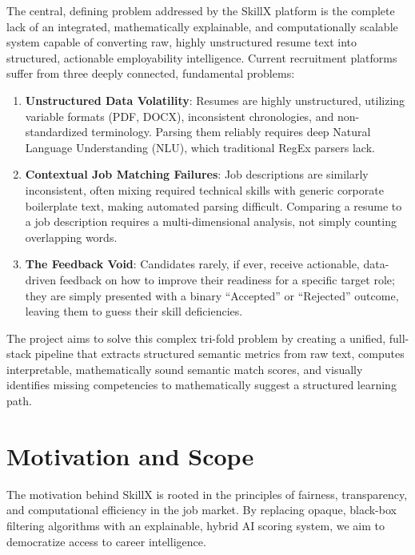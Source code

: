 \documentclass[12pt,a4paper]{report}
\begin{document}
The central, defining problem addressed by the SkillX platform is the complete lack of an integrated, mathematically explainable, and computationally scalable system capable of converting raw, highly unstructured resume text into structured, actionable employability intelligence. Current recruitment platforms suffer from three deeply connected, fundamental problems:

\begin{enumerate}
    \item \textbf{Unstructured Data Volatility}: Resumes are highly unstructured, utilizing variable formats (PDF, DOCX), inconsistent chronologies, and non-standardized terminology. Parsing them reliably requires deep Natural Language Understanding (NLU), which traditional RegEx parsers lack.
    \item \textbf{Contextual Job Matching Failures}: Job descriptions are similarly inconsistent, often mixing required technical skills with generic corporate boilerplate text, making automated parsing difficult. Comparing a resume to a job description requires a multi-dimensional analysis, not simply counting overlapping words.
    \item \textbf{The Feedback Void}: Candidates rarely, if ever, receive actionable, data-driven feedback on how to improve their readiness for a specific target role; they are simply presented with a binary ``Accepted'' or ``Rejected'' outcome, leaving them to guess their skill deficiencies.
\end{enumerate}

The project aims to solve this complex tri-fold problem by creating a unified, full-stack pipeline that extracts structured semantic metrics from raw text, computes interpretable, mathematically sound semantic match scores, and visually identifies missing competencies to mathematically suggest a structured learning path.

\section{Motivation and Scope}

The motivation behind SkillX is rooted in the principles of fairness, transparency, and computational efficiency in the job market. By replacing opaque, black-box filtering algorithms with an explainable, hybrid AI scoring system, we aim to democratize access to career intelligence. 
\end{document}
